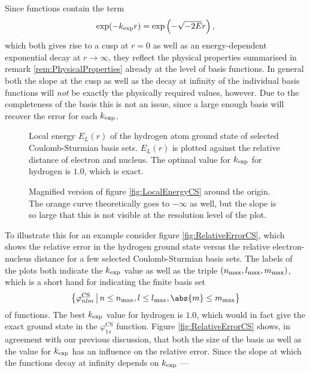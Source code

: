 \noindent
Since \CS functions contain the term
\[ \exp(-k_\text{exp} r) = \exp\left( - \sqrt{-2E}r \right), \]
which both gives rise to a cusp at $r=0$ as well as
an energy-dependent exponential decay at $r\to\infty$,
they reflect the physical properties summarised in remark \vref{rem:PhysicalProperties}
already at the level of basis functions.
In general both the slope at the cusp as well as the decay at infinity
of the individual basis functions will \emph{not} be exactly the physically
required values, however.
Due to the completeness of the \CS basis
this is not an issue, since a large enough basis will recover the error
for each $k_\text{exp}$.%
%
\begin{figure}[p]
	\centering
	\caption[Local energy of the hydrogen \HF ground state for {\CS} bases]{
		Local energy $E_L(r)$ of the hydrogen atom \HF ground state
		of selected Coulomb-Sturmian basis sets.
		$E_L(r)$ is plotted against the relative distance
		of electron and nucleus.
		The optimal value for $k_\text{exp}$ for hydrogen is $1.0$,
		which is exact.
	}
	\label{fig:LocalEnergyCS}
\end{figure}
%
\begin{figure}[p]
	\centering
	\caption[Local energy of the hydrogen \HF ground state for {\cGTO}s (magnified)]{
		Magnified version of figure \vref{fig:LocalEnergyCS}
		around the origin.
		The orange curve theoretically goes to $-\infty$ as well,
		but the slope is so large that this is not visible
		at the resolution level of the plot.
	}
	\label{fig:LocalEnergyCSZoom}
\end{figure}
%
To illustrate this for an example consider figure \vref{fig:RelativeErrorCS},
which shows the relative error in the hydrogen ground state
versus the relative electron-nucleus distance
for a few selected Coulomb-Sturmian basis sets.
The labels of the plots both indicate the $k_\text{exp}$ value as well as the
triple  $(n_\text{max}, l_\text{max}, m_\text{max})$, which is a short hand for indicating
the finite basis set
\[ \left\{ \varphi^\text{CS}_{nlm} \, \middle| \, n \leq \nmax, l \leq \lmax, \abs{m} \leq \mmax \right\} \]
of \CS functions.
The best $k_\text{exp}$ value for hydrogen is $1.0$,
which would in fact give the exact ground state in the $\varphi^\text{CS}_{1s}$ function.
Figure \vref{fig:RelativeErrorCS} shows, in agreement with our previous discussion,
that both the size of the basis as well as the value for $k_\text{exp}$ has an influence
on the relative error.
Since the slope at which the \CS functions decay
at infinity depends on $k_\text{exp}$ ---
